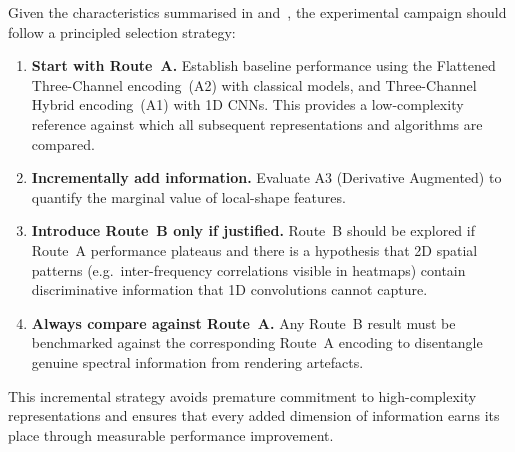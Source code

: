 Given the characteristics summarised in 
and~, the experimental campaign should follow
a principled selection strategy:

\begin{enumerate}
    \item \textbf{Start with Route~A.}  Establish baseline performance
        using the Flattened Three-Channel encoding~(A2) with classical models,
        and Three-Channel Hybrid encoding~(A1) with 1D CNNs.
        This provides a low-complexity reference against which all
        subsequent representations and algorithms are compared.
    \item \textbf{Incrementally add information.}  Evaluate A3
        (Derivative Augmented) to quantify the marginal value of local-shape features.
    \item \textbf{Introduce Route~B only if justified.}  Route~B should
        be explored if Route~A performance plateaus and there is a
        hypothesis that 2D spatial patterns (e.g.\ inter-frequency
        correlations visible in heatmaps) contain discriminative
        information that 1D convolutions cannot capture.
    \item \textbf{Always compare against Route~A.}  Any Route~B result
        must be benchmarked against the corresponding Route~A encoding to
        disentangle genuine spectral information from rendering
        artefacts.
\end{enumerate}

\noindent
This incremental strategy avoids premature commitment to high-complexity
representations and ensures that every added dimension of information
earns its place through measurable performance improvement.
